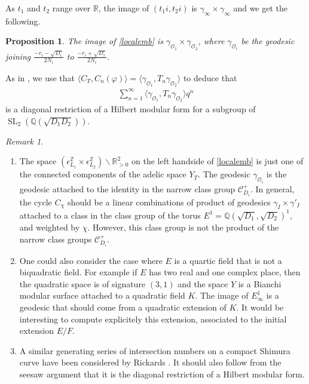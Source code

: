 \documentclass[11pt]{article} %
\newcommand{\8}{\infty}
\newcommand{\Z}{\mathbb{Z}}
\newcommand{\SL}{\operatorname{SL}}
\newcommand{\R}{\mathbb{R}}
\newcommand{\Q}{\mathbb{Q}}
\newcommand{\Ocal}{\mathcal{O}}
\newcommand{\Ccal}{\mathcal{C}}
\theoremstyle{mytheoremstyle}
\newtheorem{prop}[thm]{Proposition}
\theoremstyle{remark}
\newtheorem{rmk}{Remark}[section]
\numberwithin{equation}{section}
\begin{document}
As $t_1$ and $t_2$ range over $\R$, the image of $(t_1i,t_2i)$ is $\gamma_\8 \times \gamma_\8$ and we get the following. 
\begin{prop} The image of \eqref{localemb} is $\gamma_{\Ocal_1} \times \gamma_{\Ocal_2}$, where $\gamma_{\Ocal_i}$ be the geodesic joining $\frac{-r_i-\sqrt{D_i}}{2N_i}$ to $\frac{-r_i+\sqrt{D_i}}{2N_i}$.
\end{prop}
As in \cite{rbrforum}, we use that $\langle C_T,C_n(\varphi)\rangle =\langle \gamma_{\Ocal_1}, T_n \gamma_{\Ocal_2} \rangle $ to deduce that 
\begin{align}
    \sum_{n=1}^\8 \langle \gamma_{\Ocal_1}, T_n \gamma_{\Ocal_2} \rangle q^n
\end{align}
is a diagonal restriction of a Hilbert modular form for a subgroup of $\SL_2(\Q(\sqrt{D_1D_2}))$.

\begin{rmk}\begin{enumerate}
\item The space $(\epsilon_{L_1}^\Z \times \epsilon_{L_2}^\Z) \backslash \R_{>0}^2$ on the left handside of \eqref{localemb} is just one of the connected components of the adelic space $Y_T$. The geodesic $\gamma_{\Ocal_i}$ is the geodesic attached to the identity in the narrow class group $\Ccal_{D_i}^+$. In general, the cycle $C_\chi$ should be a linear combinations of product of geodesics $\gamma_{I} \times \gamma'_{I}$ attached to a class in the class group of the torus $E^1=\Q(\sqrt{D_1},\sqrt{D_2})^1$, and weighted by $\chi$. However, this class group is not the product of the narrow class groups $\Ccal_{D_i}^+$.

\item One could also consider the case where $E$ is a quartic field that is not a biquadratic field. For example if $E$ has two real and one complex place, then the quadratic space is of signature $(3,1)$ and the space $Y$ is a Bianchi modular surface attached to a quadratic field $K$. The image of $E^1_\8$ is a geodesic that should come from a quadratic extension of $K$. It would be interesting to compute explicitely this extension, associated to the initial extension $E/F$.
\item A similar generating series of intersection numbers on a compact { Shimura curve} have been considered by Rickards \cite{rickards}. It should also follow from the seesaw argument that it is the diagonal restriction of a Hilbert modular form.
\end{enumerate}
\end{rmk}
\end{document}
